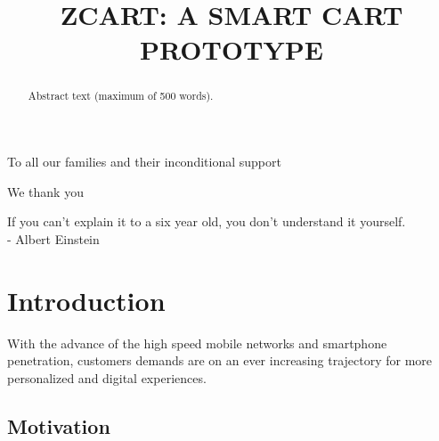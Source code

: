 \documentclass[openright]{normas-utf-tex} %
\title{\MakeUppercase{zCart: A smart cart prototype}} %
\begin{document}
\capa %
\folhaderosto %

\begin{dedicatoria}
    To all our families and their inconditional support
\end{dedicatoria}

\begin{agradecimentos}
    We thank you
\end{agradecimentos}

\begin{epigrafe}
If you can't explain it to a six year old, you don't understand it yourself. \\
- Albert Einstein
\end{epigrafe}

\begin{abstract}
Abstract text (maximum of 500 words).
\end{abstract}

\listadefiguras %
\listadetabelas %
\listadesiglas %
\listadesimbolos %

\sumario %


%
%
%
%

\setcounter{page}{12}

\chapter{Introduction}

With the advance of the high speed mobile networks and smartphone penetration,
customers demands are on an ever increasing trajectory for more personalized
and digital experiences.

\section{Motivation}
\end{document}
